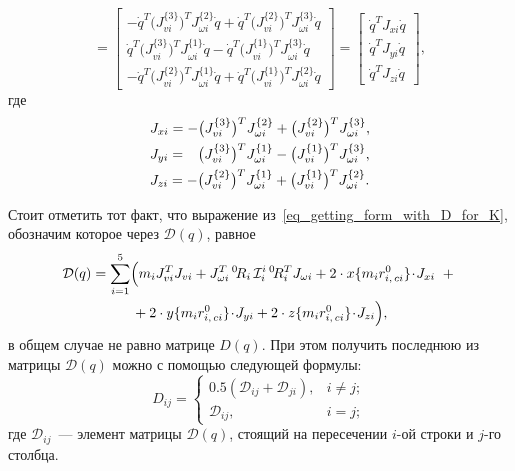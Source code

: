 \begin{equation}
=
\begin{bmatrix}
-\dot{q}^T \bigl(J_{vi}^{\{3\}} \bigr)^T J_{\omega i}^{\{2\}} \dot{q} +
\dot{q}^T \bigl( J_{vi}^{\{2\}} \bigr)^T J_{\omega i}^{\{3\}} \dot{q}
\\
\dot{q}^T \bigl( J_{vi}^{\{3\}} \bigr)^T J_{\omega i}^{\{1\}} \dot{q} -
\dot{q}^T \bigl( J_{vi}^{\{1\}} \bigr)^T J_{\omega i}^{\{3\}} \dot{q}
\\
-\dot{q}^T \bigl( J_{vi}^{\{2\}} \bigr)^T J_{\omega i}^{\{1\}} \dot{q} +
\dot{q}^T \bigl( J_{vi}^{\{1\}} \bigr)^T J_{\omega i}^{\{2\}} \dot{q}
\end{bmatrix}
=
\begin{bmatrix}
\dot{q}^T \! J_{xi} \dot{q} \\
\dot{q}^T \! J_{yi} \dot{q} \\
\dot{q}^T \! J_{zi} \dot{q}
\end{bmatrix}\!\!,
\end{equation}
где
\begin{align}
&J_{xi} =  - \bigl( J_{vi}^{\{3\}} \bigr)^T J_{\omega i}^{\{2\}} + \bigl( J_{vi}^{\{2\}} \bigr)^T J_{\omega i}^{\{3\}}, \\
&J_{yi} = \phantom{-}\bigl( J_{vi}^{\{3\}} \bigr)^T J_{\omega i}^{\{1\}} - \bigl( J_{vi}^{\{1\}} \bigr)^T J_{\omega i}^{\{3\}}, \\
&J_{zi} =  - \bigl( J_{vi}^{\{2\}} \bigr)^T J_{\omega i}^{\{1\}} + \bigl( J_{vi}^{\{1\}} \bigr)^T J_{\omega i}^{\{2\}} \ldotp
\end{align}

Стоит отметить тот факт, что выражение из~\eqref{eq_getting_form_with_D_for_K}, обозначим которое через $\mathcal{D}(q)$, равное
\begin{gather}
	\mathcal{D}(q) = \sum_{i=1}^5 \Bigl(m_i J_{vi}^T J_{vi} + J_{\omega i}^T \, {}^0\!R_i \, \mathcal{I}^{i}_i \, {}^0\!R_i^T J_{\omega i} + 2 \cdot x\{ m_i r^0_{i,\,ci} \} \!\cdot\! J_{xi} \,\, + {}\notag \\
	{} + 2 \cdot y\{ m_i r^0_{i,\,ci} \} \!\cdot\! J_{yi} + 2 \cdot z\{ m_i r^0_{i,\,ci} \} \!\cdot\! J_{zi}\Bigr),
\end{gather}
в общем случае не равно матрице $D(q)$.
При этом получить последнюю из матрицы $\mathcal{D}(q)$ можно с помощью следующей формулы:
\begin{equation}
	D_{ij} =
	\begin{cases}
		0.5 (\mathcal{D}_{ij} + \mathcal{D}_{ji}), & i \ne j; \\
		\mathcal{D}_{ij}, & i = j;
	\end{cases}
\end{equation}
где $\mathcal{D}_{ij}$~--- элемент матрицы $\mathcal{D}(q)$, стоящий на пересечении $i$-ой строки и $j$-го столбца.


